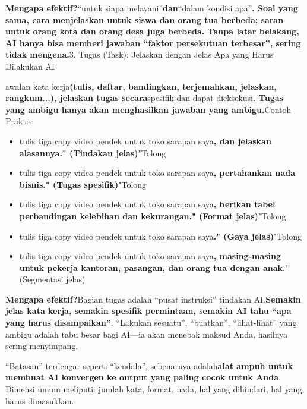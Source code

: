 \textbf{Mengapa efektif?}“untuk siapa melayani”\textbf{dan}“dalam kondisi apa”\textbf{. Soal yang sama, cara menjelaskan untuk siswa dan orang tua berbeda; saran untuk orang kota dan orang desa juga berbeda. Tanpa latar belakang, AI hanya bisa memberi jawaban “faktor persekutuan terbesar”, sering tidak mengena.}3. Tugas (Task): Jelaskan dengan Jelas Apa yang Harus Dilakukan AI


awalan kata kerja\textbf{(tulis, daftar, bandingkan, terjemahkan, jelaskan, rangkum...), jelaskan tugas secara}spesifik dan dapat dieksekusi\textbf{. Tugas yang ambigu hanya akan menghasilkan jawaban yang ambigu.}Contoh Praktis:


\begin{itemize}
  \item tulis tiga copy video pendek untuk toko sarapan saya\textbf{, dan jelaskan alasannya." (Tindakan jelas)}"Tolong
  \item tulis tiga copy video pendek untuk toko sarapan saya\textbf{, pertahankan nada bisnis." (Tugas spesifik)}"Tolong
  \item tulis tiga copy video pendek untuk toko sarapan saya\textbf{, berikan tabel perbandingan kelebihan dan kekurangan." (Format jelas)}"Tolong
  \item tulis tiga copy video pendek untuk toko sarapan saya\textbf{." (Gaya jelas)}"Tolong
  \item tulis tiga copy video pendek untuk toko sarapan saya\textbf{, masing-masing untuk pekerja kantoran, pasangan, dan orang tua dengan anak}." (Segmentasi jelas)
\end{itemize}

\textbf{Mengapa efektif?}Bagian tugas adalah “pusat instruksi” tindakan AI.\textbf{Semakin jelas kata kerja, semakin spesifik permintaan, semakin AI tahu “apa yang harus disampaikan”}. “Lakukan sesuatu”, “buatkan”, “lihat-lihat” yang ambigu adalah tabu besar bagi AI—ia akan menebak maksud Anda, hasilnya sering menyimpang.


“Batasan” terdengar seperti “kendala”, sebenarnya adalah\textbf{alat ampuh untuk membuat AI konvergen ke output yang paling cocok untuk Anda}. Dimensi umum meliputi: jumlah kata, format, nada, hal yang dihindari, hal yang harus dimasukkan.


